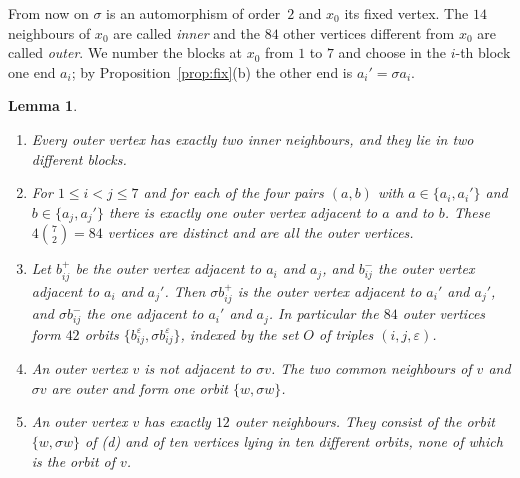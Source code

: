 \documentclass[11pt,a4paper]{article}
\newtheorem{lemma}[theorem]{Lemma}
\theoremstyle{definition}
\theoremstyle{remark}
\newcommand{\sg}{\sigma}
\begin{document}
From now on $\sg$ is an automorphism of order~$2$ and $x_0$ its fixed vertex. The $14$ neighbours of $x_0$ are
called \emph{inner} and the $84$ other vertices different from $x_0$ are called \emph{outer}. We number the blocks at
$x_0$ from $1$ to $7$ and choose in the $i$-th block one end $a_i$; by Proposition~\ref{prop:fix}(b) the other end is
$a_i'=\sg a_i$.

\begin{lemma}\label{lem:outer}
\begin{enumerate}[label=\textup{(\alph*)}]
\item Every outer vertex has exactly two inner neighbours, and they lie in two different blocks.
\item For $1\le i<j\le7$ and for each of the four pairs $(a,b)$ with $a\in\{a_i,a_i'\}$ and $b\in\{a_j,a_j'\}$ there
is exactly one outer vertex adjacent to $a$ and to $b$. These $4\binom72=84$ vertices are distinct and are all the
outer vertices.
\item Let $b_{ij}^{+}$ be the outer vertex adjacent to $a_i$ and $a_j$, and $b_{ij}^{-}$ the outer vertex adjacent
to $a_i$ and $a_j'$. Then $\sg b_{ij}^{+}$ is the outer vertex adjacent to $a_i'$ and $a_j'$, and $\sg b_{ij}^{-}$
the one adjacent to $a_i'$ and $a_j$. In particular the $84$ outer vertices form $42$ orbits
$\{b_{ij}^{\varepsilon},\sg b_{ij}^{\varepsilon}\}$, indexed by the set $O$ of triples $(i,j,\varepsilon)$.
\item An outer vertex $v$ is not adjacent to $\sg v$. The two common neighbours of $v$ and $\sg v$ are outer and
form one orbit $\{w,\sg w\}$.
\item An outer vertex $v$ has exactly $12$ outer neighbours. They consist of the orbit $\{w,\sg w\}$ of (d) and of
ten vertices lying in ten different orbits, none of which is the orbit of $v$.
\end{enumerate}
\end{lemma}
\end{document}
